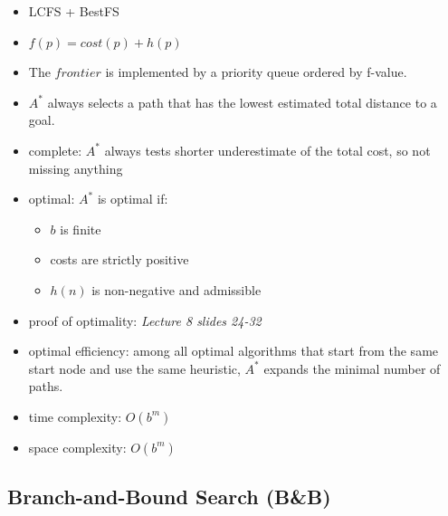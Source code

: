 \documentclass{article}
\begin{document}
\begin{itemize}
    \item LCFS + BestFS
    \item $f(p) = cost(p) + h(p)$
    \item The $frontier$ is implemented by a priority queue ordered by f-value.
    \item $A^{*}$ always selects a path that has the lowest estimated total distance to a goal.
    \item complete: $A^{*}$ always tests shorter underestimate of the total cost, so not missing anything
    \item optimal: $A^{*}$ is optimal if:
        \begin{itemize}
            \item $b$ is finite
            \item costs are strictly positive
            \item $h(n)$ is non-negative and admissible
        \end{itemize}
    \item proof of optimality: \textit{Lecture 8 slides 24-32}
    \item optimal efficiency: among all optimal algorithms that start from the same start node and use the same heuristic, $A^{*}$ expands the minimal number of paths.
    \item time complexity: $O(b^m)$
    \item space complexity: $O(b^m)$
\end{itemize}

\subsection{Branch-and-Bound Search (B\&B)}
\end{document}
